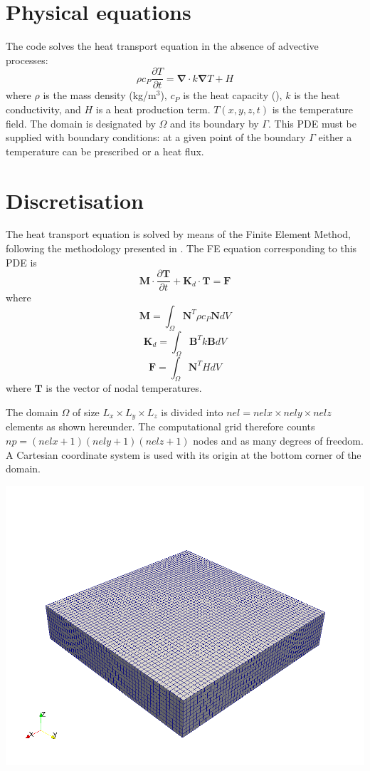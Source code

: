\documentclass[a4paper]{article}
\begin{document}
\newpage
\section{Physical equations}

The code solves the heat transport equation in the absence of advective processes:
\[
\rho c_P \frac{\partial T}{\partial t} = {\bm \nabla} \cdot k{\bm \nabla}T + H
\]
where $\rho$ is the mass density (kg/m$^3$), $c_P$ is the heat capacity (), $k$ is the heat conductivity,
and $H$ is a heat production term. $T(x,y,z,t)$ is the temperature field.
The domain is designated by $\Omega$ and its boundary by $\Gamma$.
This PDE must be supplied with boundary conditions: at a given point of the boundary $\Gamma$
either a temperature can be prescribed or a heat flux. 

\section{Discretisation}

The heat transport equation is solved by means of the Finite Element Method, following 
the methodology presented in \cite{thie11}. The FE equation corresponding to this PDE
is 
\[
{\bm M}\cdot \frac{\partial {\bm T}}{\partial t} + {\bm K}_d \cdot {\bm T} = {\bm F}
\]
where 
\[
{\bm M}=\int_\Omega {\bm N}^T \rho c_P {\bm N} dV
\]
\[
{\bm K}_d=\int_\Omega {\bm B}^T k {\bm B} dV
\]
\[
{\bm F} = \int_\Omega {\bm N}^T H dV
\]
where ${\bm T}$ is the vector of nodal temperatures.

The domain $\Omega$ of size $L_x\times L_y\times L_z$
is divided into $nel=nelx\times nely\times nelz$ elements as shown hereunder. 
The computational grid therefore counts $np=(nelx+1)(nely+1)(nelz+1)$ nodes and as many degrees of freedom.
A Cartesian coordinate system is used with its origin at the bottom corner of the domain.

\begin{center}
\includegraphics[width=15cm]{grid}
\end{center}
\end{document}
